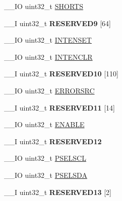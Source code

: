 \begin{DoxyCompactItemize}
\item 
\+\_\+\+\_\+\+I\+O uint32\+\_\+t \hyperlink{struct_n_r_f___t_w_i___type_af040438ee2518fc24810e02289e70ff2}{S\+H\+O\+R\+T\+S}
\item 
\hypertarget{struct_n_r_f___t_w_i___type_a4a9bc0f30476125723704e1f2ae639f7}{}\+\_\+\+\_\+\+I uint32\+\_\+t {\bfseries R\+E\+S\+E\+R\+V\+E\+D9} \mbox{[}64\mbox{]}\label{struct_n_r_f___t_w_i___type_a4a9bc0f30476125723704e1f2ae639f7}

\item 
\+\_\+\+\_\+\+I\+O uint32\+\_\+t \hyperlink{struct_n_r_f___t_w_i___type_adb2c3c8478edbf0d669a849980ec4223}{I\+N\+T\+E\+N\+S\+E\+T}
\item 
\+\_\+\+\_\+\+I\+O uint32\+\_\+t \hyperlink{struct_n_r_f___t_w_i___type_a407cf22e04ca25fb54379a60cce995e0}{I\+N\+T\+E\+N\+C\+L\+R}
\item 
\hypertarget{struct_n_r_f___t_w_i___type_a698a1d0a0f71e84d48f21f9de7e59957}{}\+\_\+\+\_\+\+I uint32\+\_\+t {\bfseries R\+E\+S\+E\+R\+V\+E\+D10} \mbox{[}110\mbox{]}\label{struct_n_r_f___t_w_i___type_a698a1d0a0f71e84d48f21f9de7e59957}

\item 
\+\_\+\+\_\+\+I\+O uint32\+\_\+t \hyperlink{struct_n_r_f___t_w_i___type_aaec62e958decacf0c29a9b006c1e59d8}{E\+R\+R\+O\+R\+S\+R\+C}
\item 
\hypertarget{struct_n_r_f___t_w_i___type_a355cab5b5b6fd95a8a77abeb37570683}{}\+\_\+\+\_\+\+I uint32\+\_\+t {\bfseries R\+E\+S\+E\+R\+V\+E\+D11} \mbox{[}14\mbox{]}\label{struct_n_r_f___t_w_i___type_a355cab5b5b6fd95a8a77abeb37570683}

\item 
\+\_\+\+\_\+\+I\+O uint32\+\_\+t \hyperlink{struct_n_r_f___t_w_i___type_a2b708676bf29851fa0841590ec9c0e5c}{E\+N\+A\+B\+L\+E}
\item 
\hypertarget{struct_n_r_f___t_w_i___type_a38a632a58cb79bdb562c9aff7cba7d7f}{}\+\_\+\+\_\+\+I uint32\+\_\+t {\bfseries R\+E\+S\+E\+R\+V\+E\+D12}\label{struct_n_r_f___t_w_i___type_a38a632a58cb79bdb562c9aff7cba7d7f}

\item 
\+\_\+\+\_\+\+I\+O uint32\+\_\+t \hyperlink{struct_n_r_f___t_w_i___type_a6e79d6cc863daa2da58e4ada813e64d0}{P\+S\+E\+L\+S\+C\+L}
\item 
\+\_\+\+\_\+\+I\+O uint32\+\_\+t \hyperlink{struct_n_r_f___t_w_i___type_acfdad2195a6941d356562796291019db}{P\+S\+E\+L\+S\+D\+A}
\item 
\hypertarget{struct_n_r_f___t_w_i___type_afcd3d1c308f25aed2ca156455b260809}{}\+\_\+\+\_\+\+I uint32\+\_\+t {\bfseries R\+E\+S\+E\+R\+V\+E\+D13} \mbox{[}2\mbox{]}\label{struct_n_r_f___t_w_i___type_afcd3d1c308f25aed2ca156455b260809}


\end{DoxyCompactItemize}
